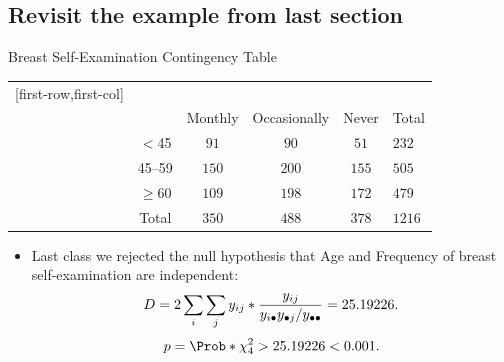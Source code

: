 \documentclass[oneside]{book}\usepackage[]{graphicx}\usepackage[svgnames]{xcolor}
\let\log\relax%
\begin{document}
\subsection*{Revisit the example from last section}
\begin{Example}{Breast Self-Examination Contingency Table}
    \begin{center}
        \begin{NiceTabular}{c|ccc|c}[first-row,first-col]
            &&\\
            && Monthly & Occasionally & Never & Total\\
            \midrule
             & $<$45 & $ 91 $ & $ 90 $ & $ 51 $ & $ 232 $\\
            & 45--59 & $ 150 $ & $ 200 $ & $ 155 $ & $ 505 $\\
            & $ \ge $60 & $ 109 $ & $ 198 $ & $ 172 $ & $ 479 $\\
            \midrule
            & Total & $ 350 $ & $ 488 $ & $ 378 $ & $ 1216 $
        \end{NiceTabular}
    \end{center}
\end{Example}
\begin{itemize}
    \item Last class we rejected the null hypothesis that Age and Frequency of breast
          self-examination are independent:
          \[ D=2\sum_i\sum_j y_{ij}\log*{\frac{y_{ij}}{y_{i\bullet}y_{\bullet j}/y_{\bullet\bullet}}}=25.19226. \]
          \[ p=\Prob*{\chi^2_{4}>25.19226}<0.001. \]
\end{itemize}
\end{document}
